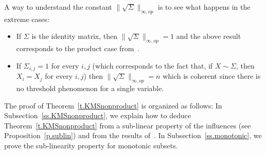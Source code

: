 A way to understand the constant $\| \sqrt{\Sigma} \|_{\infty,op}$ is to see what happens in the extreme cases:
\begin{itemize}
\item If $\Sigma$ is the identity matrix, then $\| \sqrt{\Sigma} \|_{\infty,op}=1$ and the above result corresponds to the product case from~\cite{keller2012geometric}.
\item If $\Sigma_{i,j}=1$ for every $i,j$ (which corresponds to the fact that, if $X \sim \Sigma$, then $X_i=X_j$ for every $i,j$) then $\| \sqrt{\Sigma} \|_{\infty,op}=n$ which is coherent since there is no threshold phenomenon for a single variable.
\end{itemize}

The proof of Theorem~\ref{t.KMSnonproduct} is organized as follows: In Subsection~\ref{ss.KMSnonproduct}, we explain how to deduce Theorem~\ref{t.KMSnonproduct} from a sub-linear property of the influences (see Proposition~\ref{p.sublin}) and from the results of~\cite{keller2012geometric}. In Subsection~\ref{ss.monotonic}, we prove the sub-linearity property for monotonic subsets.
